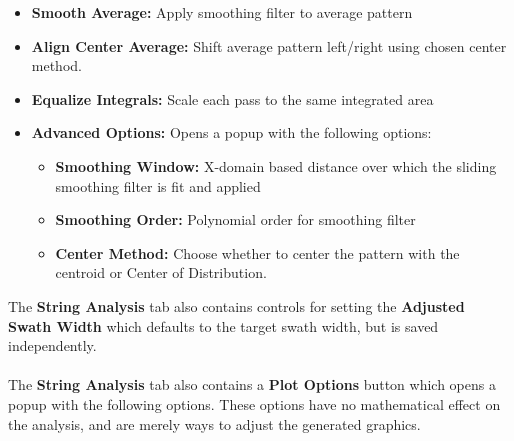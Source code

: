 \documentclass[10pt,letterpaper,titlepage]{article}
\begin{document}
    \begin{itemize}
        \item \textbf{Smooth Average:} Apply smoothing filter to average pattern
        \item \textbf{Align Center Average:} Shift average pattern left/right using chosen center method.
        \item \textbf{Equalize Integrals:} Scale each pass to the same integrated area
        \item \textbf{Advanced Options:} Opens a popup with the following options:
        \begin{itemize}
            \item \textbf{Smoothing Window:} X-domain based distance over which the sliding smoothing filter is fit and applied
            \item \textbf{Smoothing Order:} Polynomial order for smoothing filter
            \item \textbf{Center Method:} Choose whether to center the pattern with the centroid or Center of Distribution.
        \end{itemize}
    \end{itemize}
    The \textbf{String Analysis} tab also contains controls for setting the \textbf{Adjusted Swath Width} which defaults to the target swath width, but is saved independently.\\\\
    The \textbf{String Analysis} tab also contains a \textbf{Plot Options} button which opens a popup with the following options. These options have no mathematical effect on the analysis, and are merely ways to adjust the generated graphics.
\end{document}
